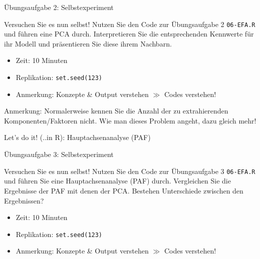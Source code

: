 \documentclass[
  ignorenonframetext,
]{beamer}
\newenvironment{Shaded}{\begin{snugshade}}{\end{snugshade}}
\newcommand{\AttributeTok}[1]{\textcolor[rgb]{0.77,0.63,0.00}{#1}}
\newcommand{\CommentTok}[1]{\textcolor[rgb]{0.56,0.35,0.01}{\textit{#1}}}
\newcommand{\DecValTok}[1]{\textcolor[rgb]{0.00,0.00,0.81}{#1}}
\newcommand{\FunctionTok}[1]{\textcolor[rgb]{0.00,0.00,0.00}{#1}}
\newcommand{\NormalTok}[1]{#1}
\newcommand{\OtherTok}[1]{\textcolor[rgb]{0.56,0.35,0.01}{#1}}
\newcommand{\SpecialCharTok}[1]{\textcolor[rgb]{0.00,0.00,0.00}{#1}}
\newcommand{\StringTok}[1]{\textcolor[rgb]{0.31,0.60,0.02}{#1}}
\providecommand{\tightlist}{%
  \setlength{\itemsep}{0pt}\setlength{\parskip}{0pt}}
\begin{document}
\begin{frame}{Übungsaufgabe 2: Selbstexperiment}
\protect\hypertarget{uxfcbungsaufgabe-2-selbstexperiment}{}
\begin{example}
Versuchen Sie es nun selbst! Nutzen Sie den Code zur Übungsaufgabe 2
\texttt{06-EFA.R} und führen eine PCA durch. Interpretieren Sie die
entsprechenden Kennwerte für ihr Modell und präsentieren Sie diese ihrem
Nachbarn.
\end{example}

\begin{itemize}
\tightlist
\item
  Zeit: 10 Minuten
\item
  Replikation: \texttt{set.seed(123)}
\item
  Anmerkung: Konzepte \& Output verstehen \(\gg\) Codes verstehen!
\end{itemize}

Anmerkung: Normalerweise kennen Sie die Anzahl der zu extrahierenden
Komponenten/Faktoren nicht. Wie man dieses Problem angeht, dazu gleich
mehr!
\end{frame}

\begin{frame}[fragile]{Let's do it! (..in R): Hauptachsenanalyse (PAF)}
\protect\hypertarget{lets-do-it-..in-r-hauptachsenanalyse-paf}{}
\begin{Shaded}
\end{Shaded}
\end{frame}

\begin{frame}{Übungsaufgabe 3: Selbstexperiment}
\protect\hypertarget{uxfcbungsaufgabe-3-selbstexperiment}{}
\begin{example}
Versuchen Sie es nun selbst! Nutzen Sie den Code zur Übungsaufgabe 3
\texttt{06-EFA.R} und führen Sie eine Hauptachsenanalyse (PAF) durch.
Vergleichen Sie die Ergebnisse der PAF mit denen der PCA. Bestehen Unterschiede
zwischen den Ergebnissen? 
\end{example}

\begin{itemize}
\tightlist
\item
  Zeit: 10 Minuten
\item
  Replikation: \texttt{set.seed(123)}
\item
  Anmerkung: Konzepte \& Output verstehen \(\gg\) Codes verstehen!
\end{itemize}
\end{frame}
\end{document}
